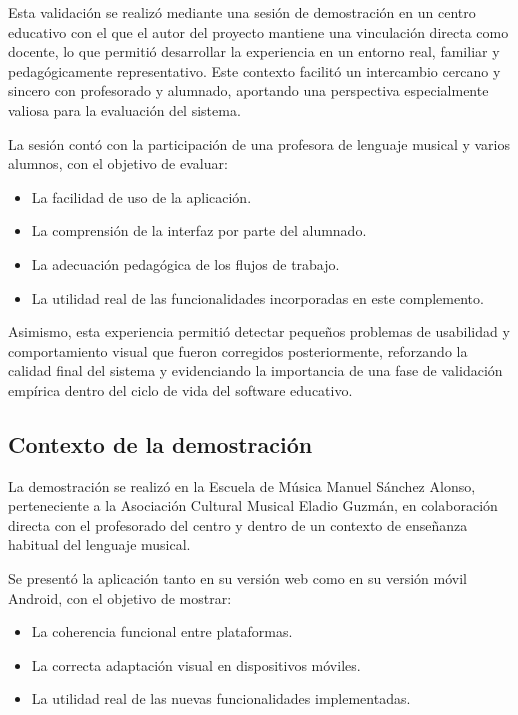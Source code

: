 Esta validación se realizó mediante una sesión de demostración en un centro educativo con el que el autor del proyecto mantiene una vinculación directa como docente, lo que permitió desarrollar la experiencia en un entorno real, familiar y pedagógicamente representativo. Este contexto facilitó un intercambio cercano y sincero con profesorado y alumnado, aportando una perspectiva especialmente valiosa para la evaluación del sistema.

La sesión contó con la participación de una profesora de lenguaje musical y varios alumnos, con el objetivo de evaluar:

\begin{itemize}
    \item La facilidad de uso de la aplicación.
    \item La comprensión de la interfaz por parte del alumnado.
    \item La adecuación pedagógica de los flujos de trabajo.
    \item La utilidad real de las funcionalidades incorporadas en este complemento.
\end{itemize}

Asimismo, esta experiencia permitió detectar pequeños problemas de usabilidad y comportamiento visual que fueron corregidos posteriormente, reforzando la calidad final del sistema y evidenciando la importancia de una fase de validación empírica dentro del ciclo de vida del software educativo.

\subsection{Contexto de la demostración}

La demostración se realizó en la Escuela de Música Manuel Sánchez Alonso, perteneciente a la Asociación Cultural Musical Eladio Guzmán, en colaboración directa con el profesorado del centro y dentro de un contexto de enseñanza habitual del lenguaje musical.

Se presentó la aplicación tanto en su versión web como en su versión móvil Android, con el objetivo de mostrar:

\begin{itemize}
    \item La coherencia funcional entre plataformas.
    \item La correcta adaptación visual en dispositivos móviles.
    \item La utilidad real de las nuevas funcionalidades implementadas.
\end{itemize}

